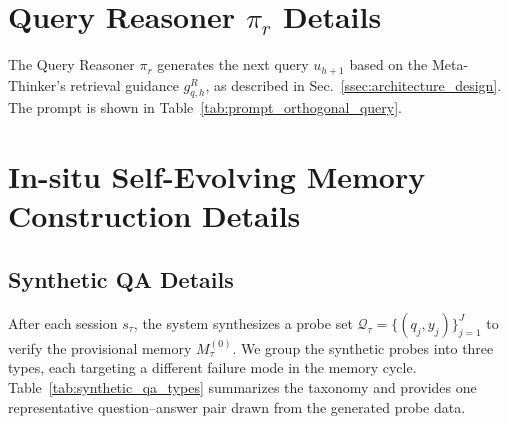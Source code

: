 \section{Query Reasoner $\pi_r$ Details}
\label{appendix:query_reasoner_details}
The Query Reasoner $\pi_r$ generates the next query $u_{h+1}$ based on the Meta-Thinker's retrieval guidance $g_{q,h}^R$, as described in Sec.~\ref{ssec:architecture_design}.
The prompt is shown in Table~\ref{tab:prompt_orthogonal_query}.



\section{In-situ Self-Evolving Memory Construction Details}
\label{appendix:explicit_reflection_details}


\subsection{Synthetic QA Details}
\label{appendix:synthetic_qa_details}
After each session $s_\tau$, the system synthesizes a probe set $\mathcal{Q}_\tau = \{(q_j, y_j)\}_{j=1}^{J}$ to verify the provisional memory $M_{\tau}^{(0)}$.
We group the synthetic probes into three types, each targeting a different failure mode in the memory cycle.
Table~\ref{tab:synthetic_qa_types} summarizes the taxonomy and provides one representative question--answer pair drawn from the generated probe data.

